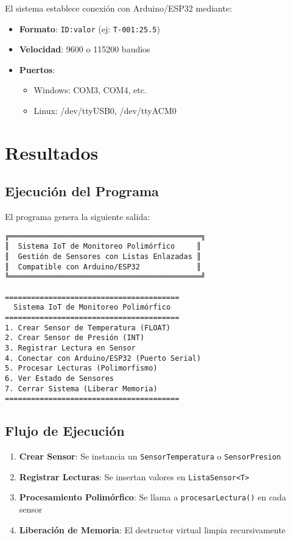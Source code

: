 \documentclass[12pt, spanish]{article}
\newcommand{\secc}[1]{\section{#1}\vspace{0.3cm}}
\begin{document}
El sistema establece conexión con Arduino/ESP32 mediante:

\begin{itemize}
    \item \textbf{Formato}: \texttt{ID:valor} (ej: \texttt{T-001:25.5})
    \item \textbf{Velocidad}: 9600 o 115200 baudios
    \item \textbf{Puertos}:
    \begin{itemize}
        \item Windows: COM3, COM4, etc.
        \item Linux: /dev/ttyUSB0, /dev/ttyACM0
    \end{itemize}
\end{itemize}

\secc{Resultados}

\subsection{Ejecución del Programa}

El programa genera la siguiente salida:

\begin{lstlisting}
╔════════════════════════════════════════════╗
║  Sistema IoT de Monitoreo Polimórfico     ║
║  Gestión de Sensores con Listas Enlazadas ║
║  Compatible con Arduino/ESP32             ║
╚════════════════════════════════════════════╝

========================================
  Sistema IoT de Monitoreo Polimórfico
========================================
1. Crear Sensor de Temperatura (FLOAT)
2. Crear Sensor de Presión (INT)
3. Registrar Lectura en Sensor
4. Conectar con Arduino/ESP32 (Puerto Serial)
5. Procesar Lecturas (Polimorfismo)
6. Ver Estado de Sensores
7. Cerrar Sistema (Liberar Memoria)
========================================
\end{lstlisting}

\subsection{Flujo de Ejecución}

\begin{enumerate}
    \item \textbf{Crear Sensor}: Se instancia un \texttt{SensorTemperatura} o \texttt{SensorPresion}
    \item \textbf{Registrar Lecturas}: Se insertan valores en \texttt{ListaSensor<T>}
    \item \textbf{Procesamiento Polimórfico}: Se llama a \texttt{procesarLectura()} en cada sensor
    \item \textbf{Liberación de Memoria}: El destructor virtual limpia recursivamente
\end{enumerate}
\end{document}
